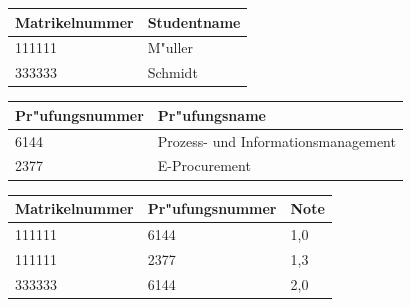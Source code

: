 \begin{tabular}{ | l | l | }
    \hline
    Matrikelnummer  & Studentname \\\hline
    111111          & M"uller\\\hline
    333333          & Schmidt\\\hline
\end{tabular}



\begin{tabular}{| l | l |}
    \hline
    Pr"ufungsnummer & Pr"ufungsname\\\hline
    6144            & Prozess- und Informationsmanagement\\\hline
    2377            & E-Procurement\\\hline
\end{tabular}


\begin{tabular}{| l | l | l |}
    \hline
    Matrikelnummer  & Pr"ufungsnummer   & Note\\\hline
    111111          & 6144              & 1,0\\\hline
    111111          & 2377              & 1,3\\\hline
    333333          & 6144              & 2,0\\\hline
\end{tabular}






















